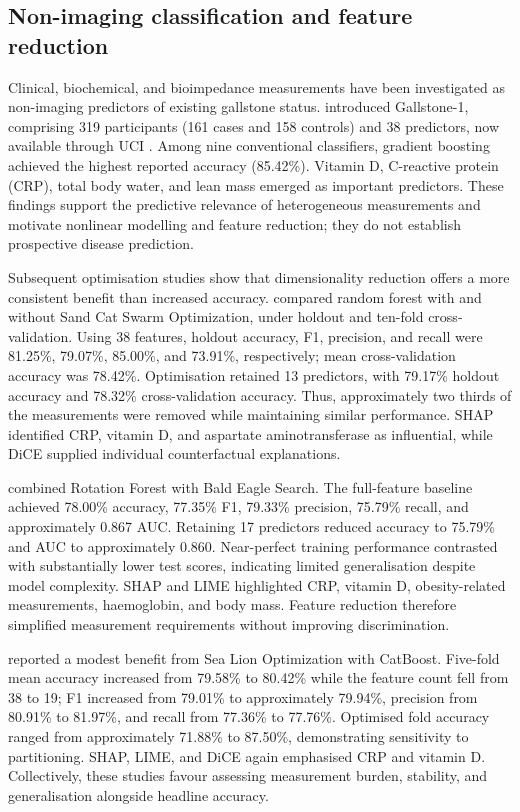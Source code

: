 \label{sec:literature_review}
\subsection{Non-imaging classification and feature reduction}
Clinical, biochemical, and bioimpedance measurements have been investigated as non-imaging predictors of existing gallstone status. \textcite{esen2024early} introduced Gallstone-1, comprising 319 participants (161 cases and 158 controls) and 38 predictors, now available through UCI \parencite{uci2025gallstone}. Among nine conventional classifiers, gradient boosting achieved the highest reported accuracy (85.42\%). Vitamin D, C-reactive protein (CRP), total body water, and lean mass emerged as important predictors. These findings support the predictive relevance of heterogeneous measurements and motivate nonlinear modelling and feature reduction; they do not establish prospective disease prediction.

Subsequent optimisation studies show that dimensionality reduction offers a more consistent benefit than increased accuracy. \textcite{sarker2025gallstone} compared random forest with and without Sand Cat Swarm Optimization, under holdout and ten-fold cross-validation. Using 38 features, holdout accuracy, F1, precision, and recall were 81.25\%, 79.07\%, 85.00\%, and 73.91\%, respectively; mean cross-validation accuracy was 78.42\%. Optimisation retained 13 predictors, with 79.17\% holdout accuracy and 78.32\% cross-validation accuracy. Thus, approximately two thirds of the measurements were removed while maintaining similar performance. SHAP identified CRP, vitamin D, and aspartate aminotransferase as influential, while DiCE supplied individual counterfactual explanations.

\textcite{shrestha2026metaheuristic} combined Rotation Forest with Bald Eagle Search. The full-feature baseline achieved 78.00\% accuracy, 77.35\% F1, 79.33\% precision, 75.79\% recall, and approximately 0.867 AUC. Retaining 17 predictors reduced accuracy to 75.79\% and AUC to approximately 0.860. Near-perfect training performance contrasted with substantially lower test scores, indicating limited generalisation despite model complexity. SHAP and LIME highlighted CRP, vitamin D, obesity-related measurements, haemoglobin, and body mass. Feature reduction therefore simplified measurement requirements without improving discrimination.

\textcite{das2026sloa} reported a modest benefit from Sea Lion Optimization with CatBoost. Five-fold mean accuracy increased from 79.58\% to 80.42\% while the feature count fell from 38 to 19; F1 increased from 79.01\% to approximately 79.94\%, precision from 80.91\% to 81.97\%, and recall from 77.36\% to 77.76\%. Optimised fold accuracy ranged from approximately 71.88\% to 87.50\%, demonstrating sensitivity to partitioning. SHAP, LIME, and DiCE again emphasised CRP and vitamin D. Collectively, these studies favour assessing measurement burden, stability, and generalisation alongside headline accuracy.

